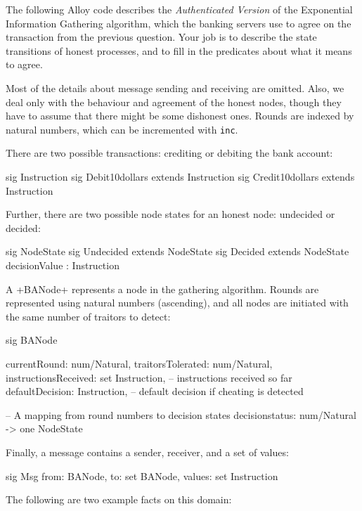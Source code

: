 The following Alloy code  describes the \emph{Authenticated Version} of the Exponential Information Gathering algorithm, which the banking servers use to agree on the transaction from the previous question.    Your job is to describe the state transitions of honest processes, and to fill in the predicates about what it means to agree.  

Most of  the details about message sending and receiving are omitted.  Also, we deal only with the behaviour and agreement of the honest nodes, though they have to assume that there might be some dishonest ones.  Rounds are indexed by natural numbers, which can be incremented with \texttt{inc}.

There are two possible transactions: crediting or debiting the bank account:


\begin{alloy}
sig Instruction {}
sig Debit10dollars extends Instruction {}
sig Credit10dollars extends Instruction {}
\end{alloy}

Further, there are two possible node states for an honest node: undecided or decided:

\begin{alloy}
sig NodeState {}
sig Undecided extends NodeState {}
sig Decided extends NodeState {
   decisionValue  : Instruction  
}
\end{alloy}

A \A+BANode+ represents a node in the gathering algorithm. Rounds are represented using natural numbers (ascending), and all nodes are initiated with the same number of traitors to detect:

\begin{alloy}
sig BANode {
   currentRound: num/Natural,
   traitorsTolerated: num/Natural,
   instructionsReceived: set Instruction, -- instructions received so far
   defaultDecision: Instruction,          -- default decision if cheating is detected

   -- A mapping from round numbers to decision states
   decisionstatus: num/Natural -> one NodeState
}
\end{alloy}

Finally, a message contains a sender, receiver, and a set of values:

\begin{alloy}
sig Msg {
   from: BANode,
   to: set BANode,
   values: set Instruction
}
\end{alloy}

The following are two example facts on this domain:

